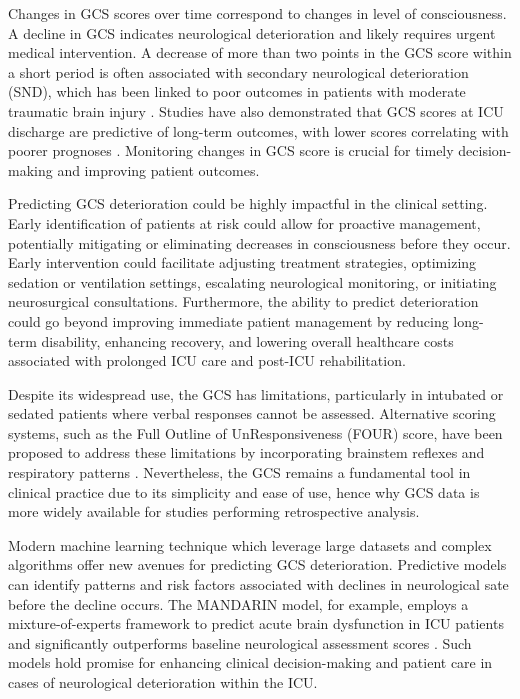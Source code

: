 \documentclass[conference]{IEEEtran}
\begin{document}
Changes in GCS scores over time correspond to changes in level of consciousness. A decline in GCS indicates neurological deterioration and likely requires urgent medical intervention. A decrease of more than two points in the GCS score within a short period is often associated with secondary neurological deterioration (SND), which has been linked to poor outcomes in patients with moderate traumatic brain injury \cite{aries2024sndtbi}. Studies have also demonstrated that GCS scores at ICU discharge are predictive of long-term outcomes, with lower scores correlating with poorer prognoses \cite{leitgeb2013gcsoutcomesi}. Monitoring changes in GCS score is crucial for timely decision-making and improving patient outcomes.

Predicting GCS deterioration could be highly impactful in the clinical setting. Early identification of patients at risk could allow for proactive management, potentially mitigating or eliminating decreases in consciousness before they occur. Early intervention could facilitate adjusting treatment strategies, optimizing sedation or ventilation settings, escalating neurological monitoring, or initiating neurosurgical consultations. Furthermore, the ability to predict deterioration could go beyond improving immediate patient management by reducing long-term disability, enhancing recovery, and lowering overall healthcare costs associated with prolonged ICU care and post-ICU rehabilitation.

Despite its widespread use, the GCS has limitations, particularly in intubated or sedated patients where verbal responses cannot be assessed. Alternative scoring systems, such as the Full Outline of UnResponsiveness (FOUR) score, have been proposed to address these limitations by incorporating brainstem reflexes and respiratory patterns \cite{schey2024gcsfour}. Nevertheless, the GCS remains a fundamental tool in clinical practice due to its simplicity and ease of use, hence why GCS data is more widely available for studies performing retrospective analysis.

Modern machine learning technique which leverage large datasets and complex algorithms offer new avenues for predicting GCS deterioration. Predictive models can identify patterns and risk factors associated with declines in neurological sate before the decline occurs. The MANDARIN model, for example, employs a mixture-of-experts framework to predict acute brain dysfunction in ICU patients and significantly outperforms baseline neurological assessment scores \cite{contreras2025mandarin}. Such models hold promise for enhancing clinical decision-making and patient care in cases of neurological deterioration within the ICU.
\end{document}
